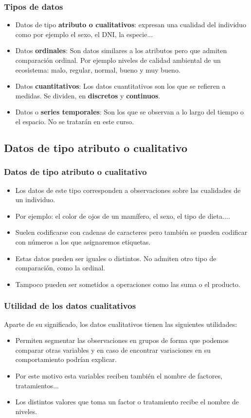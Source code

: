 \begin{frame}
\frametitle{Tipos de  datos}

\begin{itemize}
 \item Datos de tipo \textbf{atributo o cualitativos}: expresan una cualidad del individuo como por ejemplo el sexo, el DNI, la especie... 
\item Datos \textbf{ordinales}: Son  datos similares a los atributos pero que admiten comparación ordinal. Por ejemplo niveles de calidad ambiental de un ecosistema: malo, regular, normal, bueno y muy bueno.
\item Datos \textbf{cuantitativos}: Los datos cuantitativos son los que se refieren a medidas. Se dividen, en \textbf{discretos} y \textbf{continuos}.
\item Datos o \textbf{series temporales}: Son los que se observan a lo largo del tiempo o el espacio. No se tratarán en este curso.
\end{itemize}
\end{frame}


\subsection{Datos de tipo atributo o cualitativo}
\begin{frame}
\frametitle{Datos de tipo atributo o cualitativo}
\begin{itemize}
\item Los datos de este tipo corresponden a observaciones sobre las cualidades de un individuo.
\item Por ejemplo: el color de ojos de un mamífero, el sexo, el tipo de dieta....
\item Suelen codificarse con cadenas de caracteres pero también se pueden codificar con números a los que  asignaremos etiquetas.
\item Estas datos pueden ser iguales o distintos. No admiten otro tipo de comparación, como la ordinal.
\item Tampoco pueden ser sometidos a operaciones como las suma o el producto.
\end{itemize}
\end{frame}


\begin{frame}
\frametitle{Utilidad de los datos cualitativos}
Aparte de su significado, los datos cualitativos tienen las siguientes utilidades:
\begin{itemize}
\item Permiten segmentar las observaciones en grupos de forma que podemos comparar otras variables y en caso de encontrar
variaciones en su comportamiento podrían explicar.
\item  Por este motivo esta variables reciben también el nombre de factores, tratamientos...
\item Los distintos valores que toma un factor o tratamiento recibe el nombre de niveles.
\end{itemize}
\end{frame}

